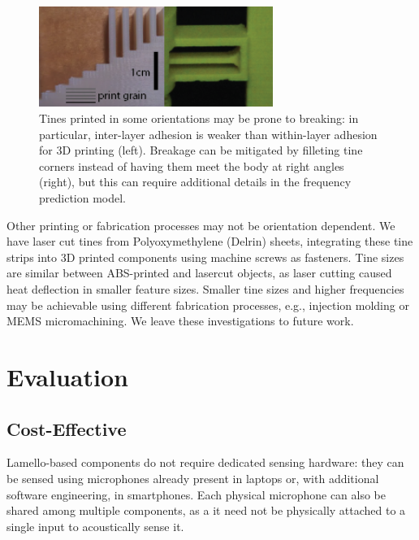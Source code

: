     \begin{figure}
  \centering
    \includegraphics[width=3in]{figures/lamello/fab.png}
  \caption{Tines printed in some orientations may be prone to breaking: in particular, inter-layer adhesion is weaker than within-layer adhesion for 3D printing (left). Breakage can be mitigated by filleting tine corners instead of having them meet the body at right angles (right), but this can require additional details in the frequency prediction model.} 
  \label{fig:lamello-break}
\end{figure}
    
    Other printing or fabrication processes may not be orientation dependent. We have laser cut tines from Polyoxymethylene (Delrin) sheets, integrating these tine strips into 3D printed components using machine screws as fasteners. Tine sizes are similar between ABS-printed and lasercut objects, as laser cutting caused heat deflection in smaller feature sizes. Smaller tine sizes and higher frequencies may be achievable using different fabrication processes, e.g., injection molding or MEMS micromachining. We leave these investigations to future work.
    

\section{Evaluation}

    \subsection{Cost-Effective}
    Lamello-based components do not require dedicated sensing hardware: they can be sensed using microphones already present in laptops or, with additional software engineering, in smartphones. Each physical microphone can also be shared among multiple components, as a it need not be physically attached to a single input to acoustically sense it.
    
